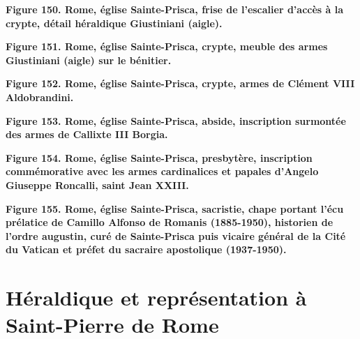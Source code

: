 \documentclass[12pt,twoside,openany]{book}
\begin{document}
\begin{center}
\par\small \textbf{Figure 150. Rome, église Sainte-Prisca, frise de l’escalier d’accès à la crypte, détail héraldique Giustiniani (aigle).}
\end{center}

\begin{center}
\par\small \textbf{Figure 151. Rome, église Sainte-Prisca, crypte, meuble des armes Giustiniani (aigle) sur le bénitier.}
\end{center}

\begin{center}
\par\small \textbf{Figure 152. Rome, église Sainte-Prisca, crypte, armes de Clément VIII Aldobrandini.}
\end{center}

\begin{center}
\par\small \textbf{Figure 153. Rome, église Sainte-Prisca, abside, inscription surmontée des armes de Callixte III Borgia.}
\end{center}

\begin{center}
\par\small \textbf{Figure 154. Rome, église Sainte-Prisca, presbytère, inscription commémorative avec les armes cardinalices et papales d’Angelo Giuseppe Roncalli, saint Jean XXIII.}
\end{center}

\begin{center}
\par\small \textbf{Figure 155. Rome, église Sainte-Prisca, sacristie, chape portant l’écu prélatice de Camillo Alfonso de Romanis (1885-1950), historien de l’ordre augustin, curé de Sainte-Prisca puis vicaire général de la Cité du Vatican et préfet du sacraire apostolique (1937-1950).}
\end{center}

\chapter{Héraldique et représentation à Saint-Pierre de Rome}
\end{document}
